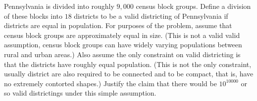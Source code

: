 \documentclass[12pt]{article}
\begin{document}

\begin{exercise}
    Pennsylvania is divided into roughly \( 9{,}000 \) census block groups.
    Define a division of these blocks into \( 18 \) districts to be a
    valid districting of Pennsylvania if districts are equal in
    population. For purposes of the problem, assume
    that census block groups are approximately equal in
    size. (This is not a valid valid assumption, census block groups
    can have widely varying populations between rural and urban
    areas.) Also assume the only constraint on valid districting is that
    the districts have roughly equal population. (This is not the only
    constraint, usually district are also required to be connected and
    to be compact, that is, have no extremely contorted shapes.)  Justify the claim
    that there would be \( 10^{10000} \) or so valid districtings
    under this simple assumption.
\end{exercise}
\end{document}
